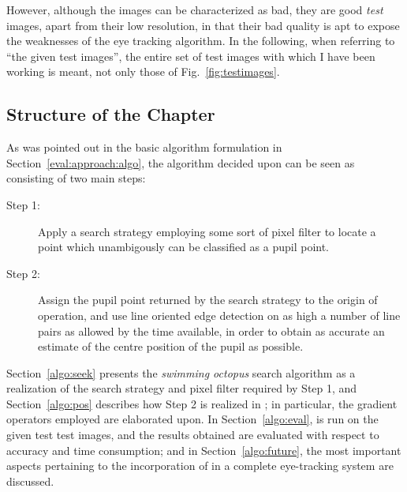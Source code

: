 However, although the images can be characterized as bad, they are
good {\em test\/} images, apart from their low resolution, in that
their bad quality is apt to expose the weaknesses of the eye tracking
algorithm.  In the following, when referring to ``the given test
images'', the entire set of test images with which I have been working
is meant, not only those of Fig.~\ref{fig:testimages}.

\subsection{Structure of the Chapter}
\label{algot:intro:structure}

As was pointed out in the basic algorithm formulation in
Section~\ref{eval:approach:algo}, the algorithm decided upon can be
seen as consisting of two main steps: 
\begin{description}
\item[Step 1:] Apply a search strategy employing some sort of pixel
  filter to locate a point which unambigously can be classified as a
  pupil point.
\item[Step 2:] Assign the pupil point returned by the search strategy
  to the origin of operation, and use line oriented edge detection on
  as high a number of line pairs as allowed by the time available, in
  order to obtain as accurate an estimate of the centre position of
  the pupil as possible.
\end{description}

Section~\ref{algo:seek} presents the {\em swimming octopus\/} search
algorithm as a realization of the search strategy and pixel filter
required by Step 1, and Section~\ref{algo:pos} describes how Step 2 is
realized in {\octopus}; in particular, the gradient operators employed
are elaborated upon.  In Section~\ref{algo:eval}, {\octopus} is run on
the given test test images, and the results obtained are evaluated
with respect to accuracy and time consumption; and in
Section~\ref{algo:future}, the most important aspects pertaining to
the incorporation of {\octopus} in a complete eye-tracking system are
discussed.
